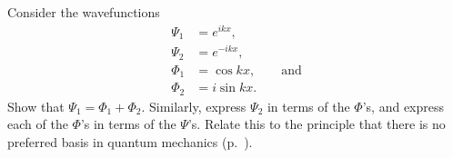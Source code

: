 Consider the wavefunctions
\begin{align*}
  \Psi_1 &= e^{ikx}, \\
  \Psi_2 &= e^{-ikx}, \\
  \Phi_1 &= \cos kx, \qquad \text{and} \\
  \Phi_2 &= i\sin kx.
\end{align*}
Show that $\Psi_1=\Phi_1+\Phi_2$. Similarly,
express $\Psi_2$ in terms of the $\Phi$'s,
and express each of the $\Phi$'s in terms of
the $\Psi$'s. Relate this to the principle that
there is no preferred basis in quantum mechanics (p.~\pageref{no-preferred-basis}).\answercheck
